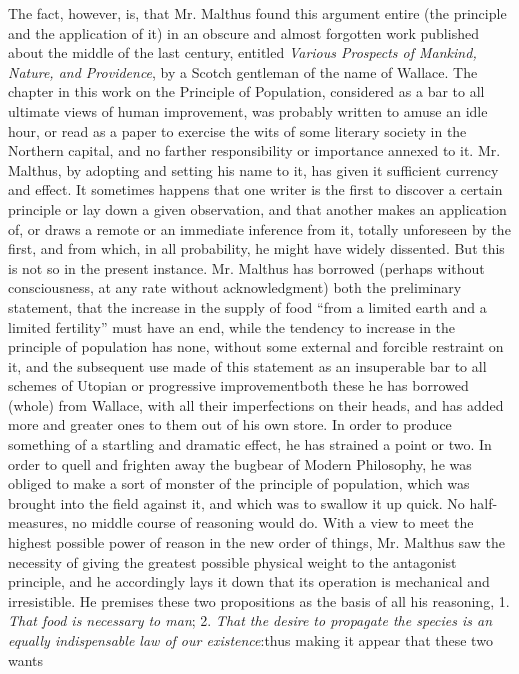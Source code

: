 The fact, however, is, that Mr. Malthus found this argument entire
(the principle and the application of it) in an obscure and almost
forgotten work published about the middle of the last century,
entitled \emph{Various Prospects of Mankind, Nature, and
Providence}, by a Scotch gentleman of the name of Wallace. The
chapter in this work on the Principle of Population, considered as
a bar to all ultimate views of human improvement, was probably
written to amuse an idle hour, or read as a paper to exercise the
wits of some literary society in the Northern capital, and no
farther responsibility or importance annexed to it. Mr.  Malthus,
by adopting and setting his name to it, has given it sufficient
currency and effect. It sometimes happens that one writer is the
first to discover a certain principle or lay down a given
observation, and that another makes an application of, or draws a
remote or an immediate inference from it, totally unforeseen by
the first, and from which, in all probability, he might have
widely dissented. But this is not so in the present
instance. Mr. Malthus has borrowed (perhaps without consciousness,
at any rate without acknowledgment) both the preliminary
statement, that the increase in the supply of food ``from a
limited earth and a limited fertility'' must have an end, while
the tendency to increase in the principle of population has none,
without some external and forcible restraint on it, and the
subsequent use made of this statement as an insuperable bar to all
schemes of Utopian or progressive improvement\textemdash both
these he has borrowed (whole) from Wallace, with all their
imperfections on their heads, and has added more and greater ones
to them out of his own store. In order to produce something of a
startling and dramatic effect, he has strained a point or two. In
order to quell and frighten away the bugbear of Modern Philosophy,
he was obliged to make a sort of monster of the principle of
population, which was brought into the field against it, and which
was to swallow it up quick. No half-measures, no middle course of
reasoning would do. With a view to meet the highest possible power
of reason in the new order of things, Mr. Malthus saw the
necessity of giving the greatest possible physical weight to the
antagonist principle, and he accordingly lays it down that its
operation is mechanical and irresistible. He premises these two
propositions as the basis of all his reasoning, 1. \emph{That food
is necessary to man}; 2. \emph{That the desire to propagate the
species is an equally indispensable law of our
existence}:\textemdash thus making it appear that these two wants
